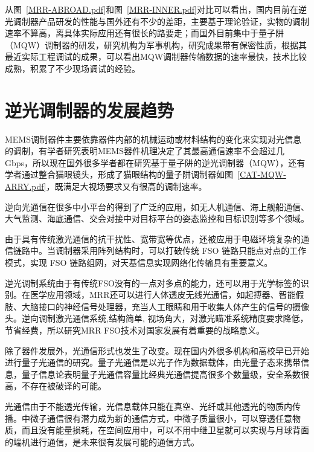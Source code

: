 从图~\ref{MRR-ABROAD.pdf}和图~\ref{MRR-INNER.pdf}对比可以看出，国内目前在逆光调制器产品研发的性能与国外还有不少的差距，主要基于理论验证，实物的调制速率不算高，离具体实际应用还有很长的路要走；而国外目前集中于量子阱（MQW）调制器的研发，研究机构为军事机构，研究成果带有保密性质，根据其最近实际工程调试的成果，可以看出MQW调制器传输数据的速率最快，技术比较成熟，积累了不少现场调试的经验。


\section{ 逆光调制器的发展趋势}
MEMS调制器件\citep{胡放荣.2010}主要依靠器件内部的机械运动或材料结构的变化来实现对光信息的调制，有学者研究表明MEMS器件机理决定了其最高通信速率不会超过几Gbps，所以现在国外很多学者都在研究基于量子阱的逆光调制器（MQW），还有学者通过整合猫眼镜头，形成了猫眼结构的量子阱调制器如图~\ref{CAT-MQW-ARRY.pdf}，既满足大视场要求又有很高的调制速率。


逆向光通信在很多中小平台的得到了广泛的应用，如无人机通信、海上舰船通信、大气监测、海底通信、交会对接中对目标平台的姿态监控和目标识别等多个领域。

由于具有传统激光通信的抗干扰性、宽带宽等优点，还被应用于电磁环境复杂的通信链路中。当调制器采用阵列结构时，可以打破传统 FSO 链路只能点对点的工作模式，实现 FSO 链路组网\citep{.2016, 张雅琳.2016, JiangHuilin.2012}，对天基信息实现网络化传输具有重要意义。

逆光调制系统由于有传统FSO没有的一点对多点的能力，还可以用于光学标签的识别。在医学应用领域，MRR还可以进行人体透皮无线光通信，如起搏器、智能假肢、大脑接口的神经信号处理器，充当人工眼睛和用于收集人体产生的信号的摄像头\citep{Majumdar.2015}。逆向调制激光通信系统,结构简单, 视场角大，对激光瞄准系统精度要求降低，节省经费，所以研究MRR FSO技术对国家发展有着重要的战略意义。


除了器件发展外，光通信形式也发生了改变。现在国内外很多机构和高校早已开始进行量子光通信的研究。量子光通信是以光子作为数据载体，由光量子态来携带信息，量子信息论表明量子光通信容量比经典光通信提高很多个数量级，安全系数很高，不存在被破译的可能\citep{yao.2011}。

光通信由于不能透光传输，光信息载体只能在真空、光纤或其他透光的物质内传播。中微子通信很有潜力成为新的通信方式，中微子质量很小，可以穿透任意物质，而且没有能量损耗，在空间应用中，可以不用中继卫星就可以实现与月球背面的端机进行通信，是未来很有发展可能的通信方式。






